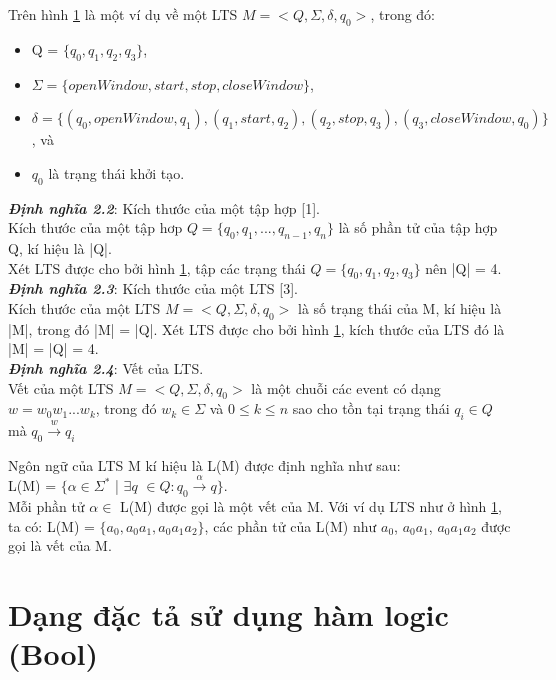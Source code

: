 \documentclass[a4paper,13pt,oneside,openany]{book}
\begin{document}
\begin{flushleft}
\begin{figure}[h]
			\label{fig:LTS1}
		\end{figure}
		Trên hình \ref{fig:LTS1} là một ví dụ về một LTS $M = <Q, \Sigma, \delta, q_{0}>$, trong đó:
		\begin{itemize}
			\item Q = $\{q_0, q_1, q_2, q_3\}$,
			\item $\Sigma = \{openWindow, start, stop, closeWindow\}$,
			\item $\delta = \{(q_0, openWindow, q_1), (q_1, start, q_2), (q_2, stop, q_3), (q_3, closeWindow, q_0)\}$, và
			\item $q_0$ là trạng thái khởi tạo.
		\end{itemize}
		\textbf{\textit{Định nghĩa 2.2}}: Kích thước của một tập hợp [1].\\
		Kích thước của một tập hơp $Q = \{q_0, q_1, ..., q_{n-1}, q_n\}$ là số phần tử của tập hợp Q, kí hiệu là |Q|.\\
		Xét LTS được cho bởi hình \ref{fig:LTS1}, tập các trạng thái $Q = \{q_0, q_1, q_2, q_3\}$ nên |Q| = 4.\\
		\textbf{\textit{Định nghĩa 2.3}}: Kích thước của một LTS [3].\\
		Kích thước của một LTS $M = <Q, \Sigma, \delta, q_{0}>$ là số trạng thái của M, kí hiệu là |M|, trong đó |M| = |Q|.
		Xét LTS được cho bởi hình \ref{fig:LTS1}, kích thước của LTS đó là |M| = |Q| = 4.\\
		\textbf{\textit{Định nghĩa 2.4}}: Vết của LTS.\\
		Vết của một LTS $M = <Q, \Sigma, \delta, q_{0}>$ là một chuỗi các event có dạng $w = w_0w_1...w_k$, trong đó $w_k \in \Sigma$ và $0 \leq k \leq n$ sao cho tồn tại trạng thái $q_i \in Q$ mà $q_0 \overset{w}{\longrightarrow} q_{i}$
		
		Ngôn ngữ của LTS M kí hiệu là L(M) được định nghĩa như sau:\\
		L(M) = $\{\alpha \in \Sigma^* $ | $\exists q$ $\in Q: q_0\overset{\alpha}{\rightarrow} q\}$.\\
		Mỗi phần tử $\alpha \in$ L(M) được gọi là một vết của M.
		Với ví dụ LTS như ở hình \ref{fig:LTS1}, ta có: L(M) = $\{a_0, a_0a_1, a_0a_1a_2\}$, các phần tử của L(M) như $a_0$, $a_0a_1$, $a_0a_1a_2$ được gọi là vết của M.
		\section{Dạng đặc tả sử dụng hàm logic (Bool)}

\end{flushleft}
\end{document}
